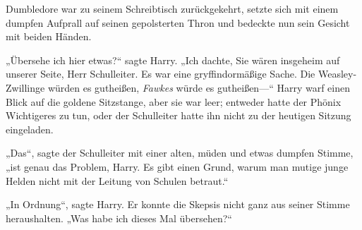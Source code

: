 Dumbledore war zu seinem Schreibtisch zurückgekehrt, setzte sich mit einem dumpfen Aufprall auf seinen gepolsterten Thron und bedeckte nun sein Gesicht mit beiden Händen.

„Übersehe ich hier etwas?“ sagte Harry.
„Ich dachte, Sie wären insgeheim auf unserer Seite, Herr Schulleiter. Es war eine gryffindormäßige Sache. Die Weasley-Zwillinge würden es gutheißen, \emph{Fawkes} würde es gutheißen—“ Harry warf einen Blick auf die goldene Sitzstange, aber sie war leer; entweder hatte der Phönix Wichtigeres zu tun, oder der Schulleiter hatte ihn nicht zu der heutigen Sitzung eingeladen.

„Das“, sagte der Schulleiter mit einer alten, müden und etwas dumpfen Stimme, „ist genau das Problem, Harry. Es gibt einen Grund, warum man mutige junge Helden nicht mit der Leitung von Schulen betraut.“

„In Ordnung“, sagte Harry. Er konnte die Skepsis nicht ganz aus seiner Stimme heraushalten.
„Was habe ich dieses Mal übersehen?“


